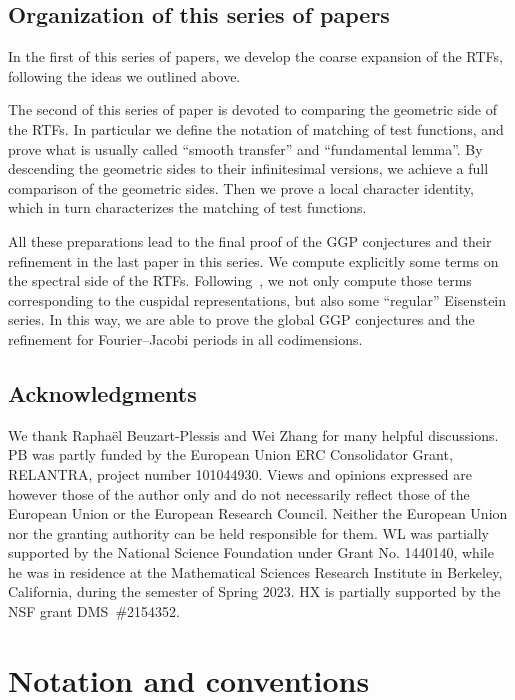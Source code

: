 \documentclass[letterpaper,11pt]{amsart}
\newcommand{\<}{\negthickspace}
\theoremstyle{definition}
\theoremstyle{plain}
\theoremstyle{remark}
\numberwithin{equation}{section}
\begin{document}
\subsection{Organization of this series of papers}
In the first of this series of papers, we develop the coarse expansion of the RTFs, following the ideas we outlined above. 

The second of this series of paper is devoted to comparing the geometric side of the RTFs. In particular we define the notation of matching of test functions, and prove what is usually called ``smooth transfer'' and ``fundamental lemma''. By descending the geometric sides to their infinitesimal versions, we achieve a full comparison of the geometric sides. Then we prove a local character identity, which in turn characterizes the matching of test functions.

All these preparations lead to the final proof of the GGP conjectures and their refinement in the last paper in this series. We compute explicitly some terms on the spectral side of the RTFs. Following~\cites{BPCZ,BPC22}, we not only compute those terms corresponding to the cuspidal representations, but also some ``regular'' Eisenstein series. In this way, we are able to prove the global GGP conjectures and the refinement for Fourier--Jacobi periods in all codimensions. 


\subsection{Acknowledgments}
We thank Rapha\"el Beuzart-Plessis and Wei Zhang for many helpful discussions.
PB was partly funded by the European Union ERC Consolidator Grant, RELANTRA, project number 101044930. Views and opinions expressed are however those of the author only and do not necessarily reflect those of the European Union or the European Research Council. Neither the European Union nor the granting authority can be held responsible for them. WL was partially supported by the National Science Foundation under Grant No. 1440140, while he was in residence at the Mathematical Sciences Research Institute in Berkeley, California, during the semester of Spring 2023. HX is partially supported by the NSF grant DMS~\#2154352.




\section{Notation and conventions}
\end{document}
